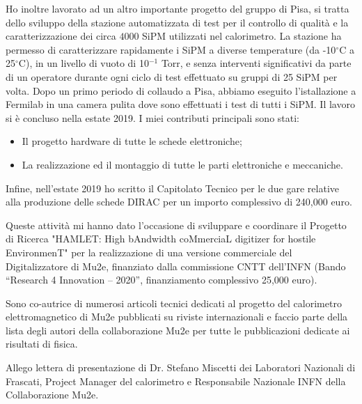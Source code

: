 \documentclass[10pt]{article}
\begin{document}
Ho inoltre lavorato ad un altro importante progetto del gruppo di Pisa, 
si tratta dello sviluppo della stazione automatizzata di test per il controllo di qualit\`a e la caratterizzazione 
dei circa $4000$ SiPM utilizzati nel calorimetro.
La stazione ha permesso di caratterizzare rapidamente i SiPM a diverse 
temperature (da -10$^{\circ}$C a 25$^{\circ}$C), in un livello di vuoto di 10$^{-1}$ Torr, e 
senza interventi significativi da parte di un operatore durante ogni ciclo di test
effettuato su gruppi di 25 SiPM per volta. 
Dopo un primo periodo di collaudo a Pisa, 
abbiamo eseguito l'istallazione a Fermilab in una camera pulita dove sono effettuati
i test di tutti i SiPM. Il lavoro si \`e concluso nella estate 2019. 
I miei contributi principali sono stati:
\begin{itemize}
\item Il progetto hardware di tutte le schede elettroniche; 
\item La realizzazione ed il montaggio di tutte le parti elettroniche e meccaniche.
\end{itemize}
Infine, nell'estate 2019 ho scritto il Capitolato Tecnico per le due gare relative alla produzione delle schede DIRAC per un importo complessivo di 240,000 euro. 

\noindent
Queste attivit\`a mi hanno dato l'occasione di sviluppare e coordinare il Progetto di Ricerca
"HAMLET: High bAndwidth coMmerciaL digitizer for hostile EnvironmenT"
per la realizzazione di una versione commerciale del Digitalizzatore di Mu2e,
finanziato dalla commissione  CNTT dell'INFN (Bando “Research 4 Innovation – 2020”, 
finanziamento complessivo 25,000 euro).

\noindent
Sono co-autrice di numerosi articoli tecnici dedicati al progetto del calorimetro elettromagnetico
di Mu2e pubblicati su riviste internazionali e faccio parte della lista degli autori della collaborazione 
Mu2e per tutte le pubblicazioni dedicate ai risultati di fisica.

\noident
Allego lettera di presentazione di Dr. Stefano Miscetti dei Laboratori Nazionali di Frascati,
Project Manager del calorimetro e Responsabile Nazionale INFN
della Collaborazione Mu2e.
\end{document}
